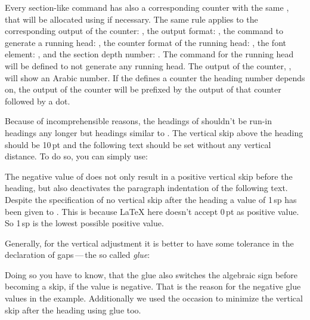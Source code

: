 Every section-like command has also a corresponding counter with the same
, that will be allocated using  if
necessary. The same rule applies to the corresponding output of the counter:
, the output format: , the
command to generate a running head: , the counter
format of the running head: , the font element:
, and the section depth number:
. The command for the running head
 will be defined to not generate any running head. The
output of the counter, , will show an Arabic number. If
the   defines a counter the heading number
depends on, the output of the counter will be prefixed by the output of that
counter followed by a dot.

\begin{Example}
  Because of incomprehensible reasons, the headings of 
  shouldn't be run-in headings any longer but headings similar to
  . The vertical skip above the heading should be 10\,pt
  and the following text should be set without any vertical distance. To do
  so, you can simply use:
\begin{lstcode}
\end{lstcode}
  The negative value of  does not only result in a
  positive vertical skip before the heading, but also deactivates the paragraph
  indentation of the following text. Despite the specification of no vertical
  skip after the heading a value of 1\,sp has been given to
  . This is because \LaTeX{} here doesn't accept 0\,pt as
  positive value. So 1\,sp is the lowest possible positive value.

  Generally, for the vertical adjustment it is better to have some
  tolerance in the declaration of gaps\,---\,the so called \emph{glue}:
\begin{lstcode}
\end{lstcode}
  Doing so you have to know, that the glue also switches the algebraic sign
  before becoming a skip, if the value is negative. That is the reason for the
  negative glue values in the example. Additionally we used the occasion to
  minimize the vertical skip after the heading using glue too.
\end{Example}

